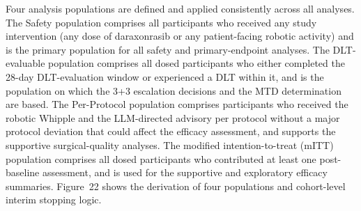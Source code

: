 Four analysis populations are defined and applied consistently across all
analyses. The Safety population comprises all participants who received any study
intervention (any dose of daraxonrasib or any patient-facing robotic activity) and
is the primary population for all safety and primary-endpoint analyses. The
DLT-evaluable population comprises all dosed participants who either completed the
28-day DLT-evaluation window or experienced a DLT within it, and is the population
on which the 3+3 escalation decisions and the MTD determination are based. The
Per-Protocol population comprises participants who received the robotic Whipple
and the LLM-directed advisory per protocol without a major protocol deviation that
could affect the efficacy assessment, and supports the supportive surgical-quality
analyses. The modified intention-to-treat (mITT) population comprises all dosed
participants who contributed at least one post-baseline assessment, and is used
for the supportive and exploratory efficacy summaries. Figure~22 shows the
derivation of four populations and cohort-level interim stopping logic.

